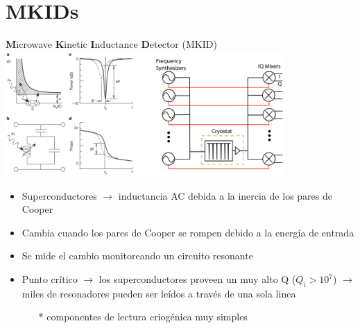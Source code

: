 \documentclass[ignorenonframetext,12pt]{beamer}
\begin{document}
\section{MKIDs}
\begin{frame}{\textbf{M}icrowave \textbf{K}inetic \textbf{I}nductance
	\textbf{D}etector (MKID)}
	\centering
	\qquad \includegraphics[width=0.8\textwidth]{concepto_mkid1}
	\begin{itemize}
		\item \footnotesize{Superconductores $\to$ inductancia AC debida a la
			inercia de los pares de Cooper}
		\item Cambia cuando los pares de Cooper se rompen debido a la
			energía de entrada
		\item Se mide el cambio monitoreando un circuito resonante
		\item Punto crítico $\to$ los \alert{superconductores proveen un muy
			alto Q} ($Q_i > 10^7$) $\to$ miles de resonadores
			pueden ser leídos a través de una sola linea 
			\begin{itemize}
				\item[*] \scriptsize{{\color{blue}componentes de lectura criogénica muy
					simples}}
			\end{itemize}
	\end{itemize}

\end{frame}
\end{document}
